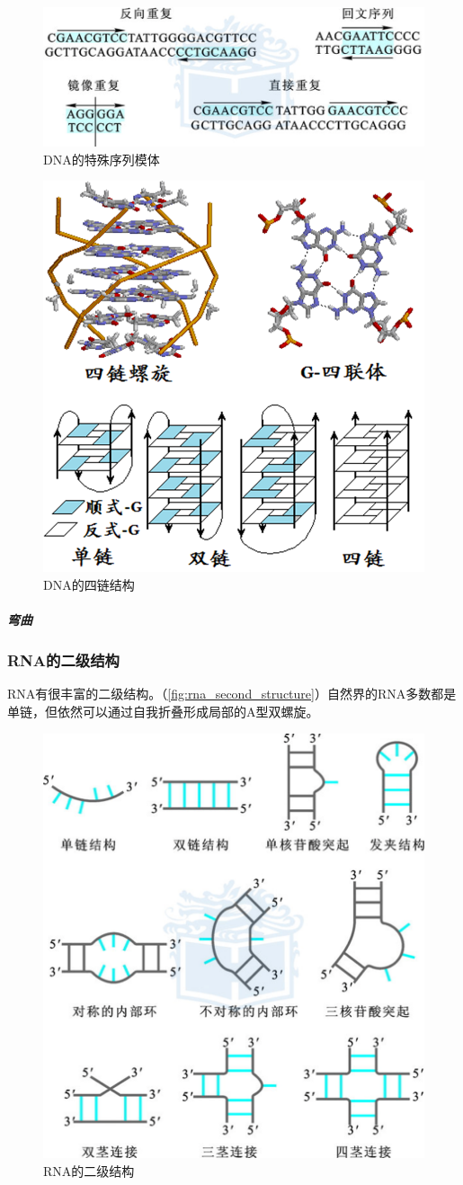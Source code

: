 \begin{figure}[htbp]
	\centering
	\includegraphics[width=0.7\linewidth]{Pics/DNA的特殊序列模体}
	\caption{DNA的特殊序列模体}
	\label{fig:dna_specific_sequence_motif}
\end{figure}

\begin{figure}[htbp]
	\centering
	\includegraphics[width=0.5\linewidth]{Pics/DNA的四链结构}
	\caption{DNA的四链结构}
	\label{fig:dna_4strand}
\end{figure}


\subparagraph{弯曲}
\subsubsection{RNA的二级结构}

RNA有很丰富的二级结构。（\autoref{fig:rna_second_structure}）自然界的RNA多数都是单链，但依然可以通过自我折叠形成局部的A型双螺旋。

\begin{figure}[htbp]
	\centering
	\includegraphics[width=0.7\linewidth]{Pics/RNA的二级结构}
	\caption{RNA的二级结构}
	\label{fig:rna_second_structure}
\end{figure}


